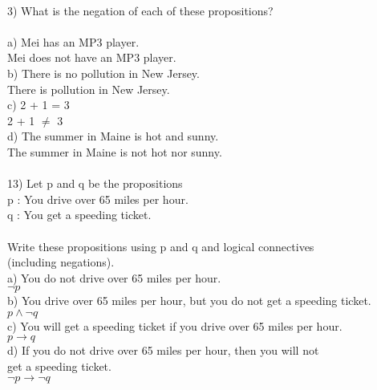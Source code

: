 \documentclass{article}
\begin{document}
\begin{flushleft}
~\\3) What is the negation of each of these propositions? \\ 
~\\\setlength\parindent{24pt}a) Mei has an MP3 player. \\
\setlength\parindent{48pt} Mei does not have an MP3 player. \\
\setlength\parindent{24pt}b) There is no pollution in New Jersey.\\
\setlength\parindent{48pt} There is pollution in New Jersey.\\
\setlength\parindent{24pt}c) 2 + 1 = 3\\
\setlength\parindent{48pt} 2 + 1 $\neq$ 3 \\
\setlength\parindent{24pt}d) The summer in Maine is hot and sunny. \\
\setlength\parindent{48pt} The summer in Maine is not hot nor sunny.\\
~\\
\setlength\parindent{0pt}
13) Let p and q be the propositions \\
\setlength\parindent{24pt} p : You drive over 65 miles per hour.\\
\setlength\parindent{24pt} q : You get a speeding ticket. \\
~\\Write these propositions using p and q and logical connectives\\
\setlength\parindent{24pt} (including negations).\\
a) You do not drive over 65 miles per hour.\\
\setlength\parindent{48pt} $\neg p$ \\ 
\setlength\parindent{24pt}b) You drive over 65 miles per hour, but you do not get a speeding ticket.\\
\setlength\parindent{48pt}$p \land\neg q$\\
\setlength\parindent{24pt}c) You will get a speeding ticket if you drive over 65 miles per hour. \\
\setlength\parindent{48pt}$p \rightarrow q$ \\
\setlength\parindent{24pt}d) If you do not drive over 65 miles per hour, then you will not \\
\setlength\parindent{24pt}get a speeding ticket.\\
\setlength\parindent{48pt}$\neg p \rightarrow \neg q$\\


\end{flushleft}
\end{document}
